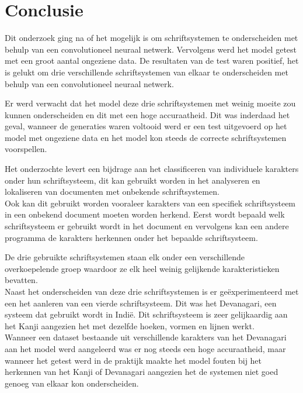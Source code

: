 
\chapter{Conclusie}
\label{ch:conclusie}


Dit onderzoek ging na of het mogelijk is om schriftsystemen te onderscheiden met behulp van een convolutioneel neuraal netwerk.
Vervolgens werd het model getest met een groot aantal ongeziene data.
De resultaten van de test waren positief, het is gelukt om drie verschillende schriftsystemen van elkaar te onderscheiden met behulp van een convolutioneel neuraal netwerk.

Er werd verwacht dat het model deze drie schriftsystemen met weinig moeite zou kunnen onderscheiden en dit met een hoge accuraatheid.
Dit was inderdaad het geval, wanneer de generaties waren voltooid werd er een test uitgevoerd op het model met ongeziene data en het model kon steeds de correcte schriftsystemen voorspellen.

Het onderzochte levert een bijdrage aan het classificeren van individuele karakters onder hun schriftsysteem, dit kan gebruikt worden in het analyseren en lokaliseren van documenten met onbekende schriftsystemen.\\
Ook kan dit gebruikt worden vooraleer karakters van een specifiek schriftsysteem in een onbekend document moeten worden herkend. Eerst wordt bepaald welk schriftsysteem er gebruikt wordt in het document en vervolgens kan een andere programma de karakters herkennen onder het bepaalde schriftsysteem.

De drie gebruikte schriftsystemen staan elk onder een verschillende overkoepelende groep waardoor ze elk heel weinig gelijkende karakteristieken bevatten. \\
Naast het onderscheiden van deze drie schriftsystemen is er geëxperimenteerd met een het aanleren van een vierde schriftsysteem.
Dit was het Devanagari, een systeem dat gebruikt wordt in Indië.
Dit schriftsysteem is zeer gelijkaardig aan het Kanji aangezien het met dezelfde hoeken, vormen en lijnen werkt.\\
Wanneer een dataset bestaande uit verschillende karakters van het Devanagari aan het model werd aangeleerd was er nog steeds een hoge accuraatheid, maar wanneer het getest werd in de praktijk maakte het model fouten bij het herkennen van het Kanji of Devanagari aangezien het de systemen niet goed genoeg van elkaar kon onderscheiden.

